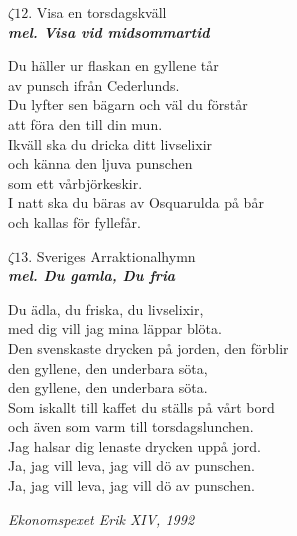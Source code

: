 \documentclass[a6paper,10pt]{article}
\newcommand{\mel}[1]{\small\textbf{\textit{mel. #1 \\}}}
\begin{document}
\setlength{\oddsidemargin}{-0.47in}
\noindent

\begin{center}
\Large $\zeta12$. Visa en torsdagskväll \\ 
\mel{Visa vid midsommartid}
\end{center}
Du häller ur flaskan en gyllene tår\\
av punsch ifrån Cederlunds.\\
Du lyfter sen bägarn och väl du förstår\\
att föra den till din mun.\\
Ikväll ska du dricka ditt livselixir\\
och känna den ljuva punschen\\
som ett vårbjörkeskir.\\
I natt ska du bäras av Osquarulda på bår\\
och kallas för fyllefår.
\vspace{40pt}
\begin{center}
\Large $\zeta13$. Sveriges Arraktionalhymn \\ 
\mel{Du gamla, Du fria}
\end{center}
Du ädla, du friska, du livselixir,\\
med dig vill jag mina läppar blöta.\\
Den svenskaste drycken på jorden, den förblir\\
den gyllene, den underbara söta,\\
den gyllene, den underbara söta.
\vspace{5pt}\\
Som iskallt till kaffet du ställs på vårt bord\\
och även som varm till torsdagslunchen.\\
Jag halsar dig lenaste drycken uppå jord.\\
Ja, jag vill leva, jag vill dö av punschen.\\
Ja, jag vill leva, jag vill dö av punschen.
\begin{flushright}
\textit{Ekonomspexet Erik XIV, 1992}
\end{flushright}
\end{document}
